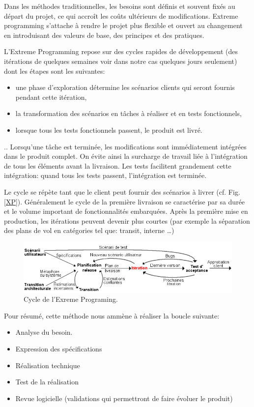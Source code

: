 Dans les méthodes traditionnelles, les besoins sont définis et souvent fixés au départ du projet, ce qui accroît les coûts ultérieurs de modifications. Extreme programming s'attache à rendre le projet plus flexible et ouvert au changement en introduisant des valeurs de base, des principes et des pratiques.

L'Extreme Programming repose sur des cycles rapides de développement (des itérations de quelques semaines voir dans notre cas quelques jours seulement) dont les étapes sont les suivantes:
\begin{itemize}
\item une phase d'exploration détermine les scénarios clients qui seront fournis pendant cette itération,
\item la transformation des scénarios en tâches à réaliser et en tests fonctionnels,
\item lorsque tous les tests fonctionnels passent, le produit est livré.
\end{itemize}
..
Lorsqu'une tâche est terminée, les modifications sont immédiatement intégrées dans le produit complet. On évite ainsi la surcharge de travail liée à l'intégration de tous les éléments avant la livraison. Les tests facilitent grandement cette intégration: quand tous les tests passent, l'intégration est terminée.

Le cycle se répète tant que le client peut fournir des scénarios à livrer (cf. Fig. \vref{XP}). Généralement le cycle de la première livraison se caractérise par sa durée et le volume important de fonctionnalités embarquées. Après la première mise en production, les itérations peuvent devenir plus courtes (par exemple la séparation des plans de vol en catégories tel que: transit, interne …)
\begin{figure}
\center
\includegraphics[width=15cm]{images/xp.png}
\caption{Cycle de l'Exreme Programing.}
\label{XP}
\end{figure}

Pour résumé, cette méthode nous ammène à réaliser la boucle suivante:
\begin{itemize}
\item Analyse du besoin.
\item Expression des spécifications
\item Réalisation technique
\item Test de la réalisation
\item Revue logicielle (validations qui permettront de faire évoluer le produit)
\end{itemize}

